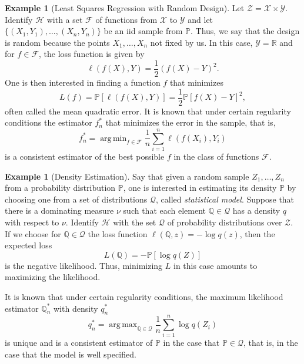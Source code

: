 \documentclass{uvamath}
\newcommand*{\reals}{\mathbb{R}}
\newcommand*{\calF}{\mathcal{F}}
\newcommand*{\calH}{\mathcal{H}}
\newcommand*{\calQ}{\mathcal{Q}}
\newcommand*{\calX}{\mathcal{X}}
\newcommand*{\calY}{\mathcal{Y}}
\newcommand*{\calZ}{\mathcal{Z}}
\newcommand*{\bbP}{\mathbb{P}}
\newcommand*{\bbQ}{\mathbb{Q}}
\newcommand*{\expv}[1]{\mathbb{P}\left[#1\right]}
\DeclareMathOperator*{\argmin}{arg\,min}
\DeclareMathOperator*{\argmax}{arg\,max}
\theoremstyle{remark}
\theoremstyle{definition}
\theoremstyle{definition}
\theoremstyle{definition}
\newtheorem{example}[theorem]{Example}
\theoremstyle{definition}
\theoremstyle{definition}
\begin{document}
\begin{example}[Least Squares Regression with Random Design]
  Let $\calZ = \calX\times\calY$. Identify $\calH$ with a set $\calF$
  of functions from $\calX$ to $\calY$ and let
  $\{(X_1, Y_1),\dots, (X_n, Y_n)\}$ be an iid sample from
  $\bbP$. Thus, we say that the design is random because the points
  $X_1,\dots,X_n$ not fixed by us. In this case, $\calY = \reals$ and
  for $f\in\calF$, the loss function is given by
  $$\ell(f(X), Y) = \frac{1}{2}(f(X)-Y)^2.$$  One is then interested in
  finding a function $f$ that minimizes
  \begin{equation*}
    L(f) = \bbP[\ell(f(X),Y)]=
    \frac{1}{2}\bbP[f(X) - Y]^2,
  \end{equation*}
  often called the mean quadratic error. It is known that under
  certain regularity conditions the estimator $f^*_n$ that minimizes
  the error in the sample, that is,
  \begin{equation*}
    f^*_n = \argmin_{f\in\calF}\frac{1}{n}\sum_{i=1}^{n}\ell(f(X_i), Y_i)
  \end{equation*}
  is a consistent estimator of the best possible $f$ in the class of
  functions $\calF$.
\end{example}

\begin{example}[Density Estimation]\label{ex:density_estimation}
  Say that given a random sample $Z_1,\dots,Z_n$ from a probability
  distribution $\bbP$, one is interested in estimating its density
  $\bbP$ by choosing one from a set of distributions $\calQ$, called
  \textit{statistical model}. Suppose that there is a dominating
  measure $\nu$ such that each element $\bbQ\in\calQ$ has a density
  $q$ with respect to $\nu$.  Identify $\calH$ with the set $\calQ$ of
  probability distributions over $\calZ$. If we choose for
  $\bbQ\in\calQ$ the loss function $\ell(\bbQ, z) = -\log q(z)$, then
  the expected loss
  \begin{equation*}
    L(\bbQ) = -\expv{ \log q(Z)}
  \end{equation*}
  is the negative likelihood. Thus, minimizing $L$ in this case amounts to
  maximizing the likelihood.

  It is known that under certain regularity conditions, the maximum
  likelihood estimator $\bbQ^*_n$ with density $q^*_n$
  \begin{equation*}
    q^*_n = \argmax_{\bbQ\in\calQ}\frac{1}{n}\sum_{i=1}^n\log q(Z_i)
  \end{equation*}
  is unique and is a consistent estimator of $\bbP$ in the case that
  $\bbP \in \calQ$, that is, in the case that the model is well
  specified.
\end{example}
\end{document}
